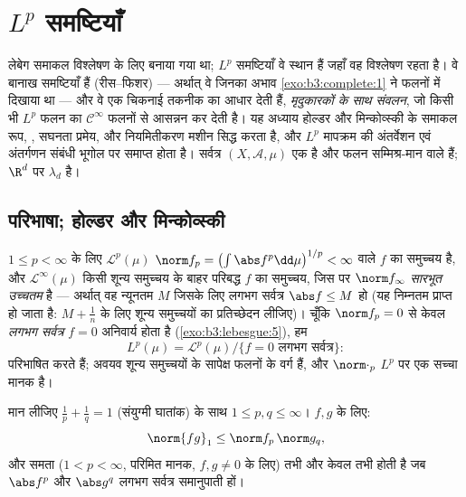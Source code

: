 \chapter{\texorpdfstring{$L^p$}{Lp} समष्टियाँ}\label{ch:b3:lp}

लेबेग समाकल विश्लेषण के लिए बनाया गया था; $L^p$ समष्टियाँ वे स्थान
हैं जहाँ वह विश्लेषण रहता है। वे बानाख समष्टियाँ हैं (रीस--फिशर)
--- अर्थात् वे  जिनका अभाव \cref{exo:b3:complete:1} ने  फलनों में दिखाया था
--- और वे एक चिकनाई तकनीक का आधार देती हैं, \emph{मृदुकारकों के
साथ संवलन}, जो किसी भी $L^p$ फलन का $\mathcal C^\infty$ फलनों से आसन्नन कर देती है।
यह अध्याय होल्डर और मिन्कोव्स्की के समाकल रूप, , सघनता
प्रमेय, और नियमितीकरण मशीन सिद्ध करता है, और $L^p$ मापक्रम की
अंतर्वेशन एवं अंतर्गणन संबंधी भूगोल पर समाप्त होता है। सर्वत्र
$(X, \mathcal A, \mu)$ एक  है और फलन सम्मिश्र-मान वाले हैं; $\R^d$ पर 
$\lambda_d$ है।

\section{परिभाषा; होल्डर और मिन्कोव्स्की}

\begin{definition}\label{def:b3:lp:space}
$1 \leq p < \infty$ के लिए $\mathcal L^p(\mu)$ $\norm f_p = \bigl(\int\abs
f^p\dd\mu\bigr)^{1/p} < \infty$ वाले  $f$ का समुच्चय है, और $\mathcal L^\infty(\mu)$
किसी शून्य समुच्चय के बाहर परिबद्ध $f$ का समुच्चय, जिस पर $\norm
f_\infty$
\emph{सारभूत उच्चतम} है --- अर्थात् वह न्यूनतम $M$ जिसके लिए
लगभग सर्वत्र $\abs f \leq M$ हो (यह निम्नतम प्राप्त हो जाता है: $M + \frac1n$ के लिए
शून्य समुच्चयों का प्रतिच्छेदन लीजिए)। चूँकि $\norm f_p = 0$ से केवल
\emph{लगभग सर्वत्र} $f
= 0$ अनिवार्य होता है (\cref{exo:b3:lebesgue:5}), हम
\[
L^p(\mu) = \mathcal L^p(\mu)/\{f = 0 \text{ लगभग सर्वत्र}\} :
\]
परिभाषित करते हैं; अवयव शून्य समुच्चयों के सापेक्ष फलनों के वर्ग
हैं, और $\norm\cdot_p$ $L^p$ पर एक सच्चा मानक है।
\end{definition}

\begin{theorem}[होल्डर की असमिका]\label{thm:b3:lp:holder}
मान लीजिए $\frac1p + \frac1q = 1$ (संयुग्मी घातांक) के साथ $1 \leq p, q \leq \infty$।  $f, g$ के
लिए:
\[
\norm{fg}_1 \leq \norm f_p\,\norm g_q ,
\]
और समता ($1 < p < \infty$, परिमित मानक, $f,g\ne0$ के लिए) तभी और केवल तभी होती है
जब $\abs f^p$ और $\abs g^q$ लगभग सर्वत्र समानुपाती हों।
\end{theorem}

